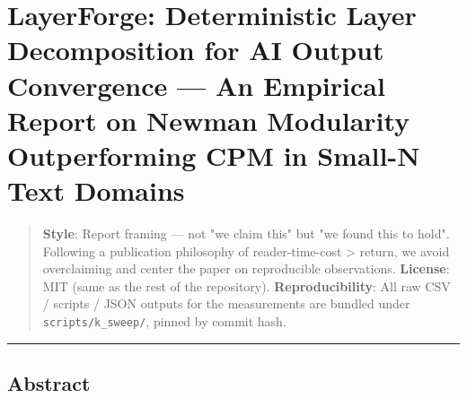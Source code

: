 \documentclass[
]{article}
\author{}
\date{}
\begin{document}
\section{LayerForge: Deterministic Layer Decomposition for AI Output
Convergence --- An Empirical Report on Newman Modularity Outperforming
CPM in Small-N Text
Domains}\label{layerforge-deterministic-layer-decomposition-for-ai-output-convergence--an-empirical-report-on-newman-modularity-outperforming-cpm-in-small-n-text-domains}

\begin{quote}
\textbf{Style}: Report framing --- not "we claim this" but "we found
this to hold". Following a publication philosophy of reader-time-cost
\textgreater{} return, we avoid overclaiming and center the paper on
reproducible observations. \textbf{License}: MIT (same as the rest of
the repository). \textbf{Reproducibility}: All raw CSV / scripts / JSON
outputs for the measurements are bundled under
\texttt{scripts/k\_sweep/}, pinned by commit hash.
\end{quote}

\begin{center}\rule{0.5\linewidth}{0.5pt}\end{center}

\subsection{Abstract}\label{abstract}
\end{document}
